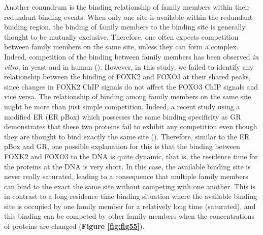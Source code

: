 Another conundrum is the binding relationship of family members within their redundant binding events. When only one site is available within the redundant binding region, the binding of family members to the binding site is generally thought to be mutually exclusive. Therefore, one often expects competition between family members on the same site, unless they can form a complex. Indeed, competition of the binding between family members has been observed \textit{in vitro}, in yeast and in human (\cite{pierce2003sum1,boros2009overlapping,zhou2011integrated,lickwar2012genome-wide}). However, in this study, we failed to identify any relationship between the binding of FOXK2 and FOXO3 at their shared peaks, since changes in FOXK2 ChIP signals do not affect the FOXO3 ChIP signals and vice versa. The relationship of binding among family members on the same site might be more than just simple competition. Indeed, a recent study using a modified ER (ER pBox) which possesses the same binding specificity as GR demonstrates that these two proteins fail to exhibit any competition even though they are thought to bind exactly the same site (\cite{voss2011dynamic}). Therefore, similar to the ER pBox and GR, one possible explanation for this is that the binding between FOXK2 and FOXO3 to the DNA is quite dynamic, that is, the residence time for the proteins at the DNA is very short. In this case, the available binding site is never really saturated, leading to a consequence that multiple family members can bind to the exact the same site without competing with one another. This is in contrast to a long-residence time binding situation where the available binding site is occupied by one family member for a relatively long time (saturated), and this binding can be competed by other family members when the concentrations of proteins are changed (\textbf{Figure \ref{fig:fig55}}).

